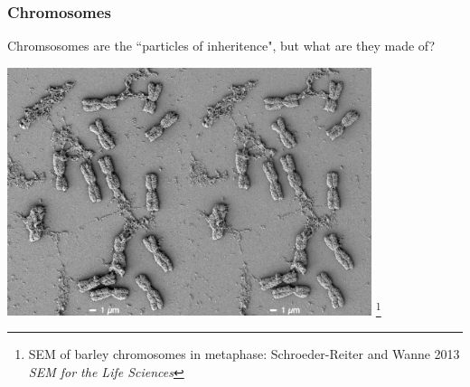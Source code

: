 \documentclass{beamer}
\newcommand\blfootnote[1]{%
	\begingroup
	\renewcommand\thefootnote{}\footnote{#1}%
	\addtocounter{footnote}{-1}%
	\endgroup
}
\begin{document}
\begin{frame}
\frametitle{Chromosomes}
	\Large \centering	Chromsosomes are the ``particles of inheritence", but what are they made of?
			
		\includegraphics[keepaspectratio, width  =0.8\textwidth]{img/barleyChroms}\blfootnote{SEM of barley chromosomes in metaphase: Schroeder-Reiter and Wanne 2013 \textit{SEM for the Life Sciences}}
\end{frame}	

		
		
\end{document}
